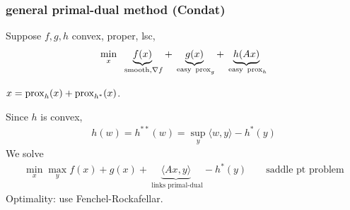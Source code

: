 \documentclass[class=article,crop=false]{standalone}
\begin{document}
\subsubsection{general primal-dual method (Condat)}
Suppose $ f,g,h$ convex, proper, lsc,
\begin{align*}
	\min_x \ \underbrace{ f(x)}_{ \text{ smooth}, \nabla f } + \underbrace{ g(x)}_{ \text{ easy } \operatorname{prox}_g} + \underbrace{ h(Ax)}_{ \text{ easy } \operatorname{prox}_{h} }  
\end{align*}
\begin{lem}
	$ x = \operatorname{prox}_h(x) + \operatorname{prox}_{h^* }(x)$.
\end{lem}
Since $ h$ is convex,
\begin{align*}
	h(w) =h^{* *} (w) = \sup_y \langle w,y \rangle - h^* (y) 
\end{align*}
We solve
\begin{align*}
	\min_x \max_y f(x) + g(x) + \underbrace{ \langle Ax,y \rangle }_{ \text{ links primal-dual} } -h^* (y) && \text{ saddle pt problem} 
\end{align*}
Optimality: use Fenchel-Rockafellar.
\end{document}
